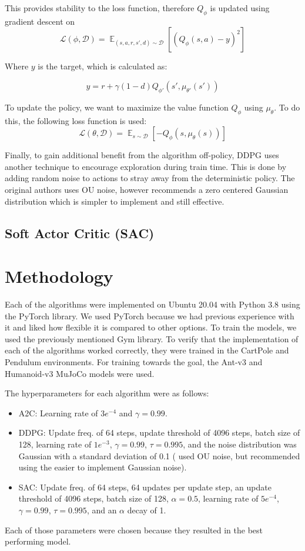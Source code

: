 \documentclass[conference]{IEEEtran}
\begin{document}
This provides stability to the loss function, therefore $Q_\phi$ is updated using gradient descent on
$$
    \mathcal{L}(\phi, \mathcal{D}) = \mathop{\mathbb{E}}_{(s,a,r,s',d) \sim \mathcal{D}}\left[\left(Q_\phi(s,a) - y\right)^2\right]
$$
\begin{flushleft}
    Where $y$ is the target, which is calculated as:
\end{flushleft}
$$
    y = r + \gamma(1-d)Q_{\phi'}(s', \mu_{\theta'}(s'))
$$

To update the policy, we want to maximize the value function $Q_\phi$ using $\mu_\theta$. To do this, the following loss function is used:
$$
    \mathcal{L}(\theta, \mathcal{D}) = \mathop{\mathbb{E}}_{s \sim \mathcal{D}}\left[-Q_\phi(s, \mu_\theta(s))\right]
$$

Finally, to gain additional benefit from the algorithm off-policy, DDPG uses another technique to encourage exploration during train time. This is done by adding random noise to actions to stray away from the deterministic policy. The original authors uses OU noise, however \cite{spinning_up_ddpg} recommends a zero centered Gaussian distribution which is simpler to implement and still effective.

\subsection{Soft Actor Critic (SAC)}

\blindtext

\section{Methodology}

Each of the algorithms were implemented on Ubuntu 20.04 with Python 3.8 using the PyTorch library. We used PyTorch because we had previous experience with it and liked how flexible it is compared to other options. To train the models, we used the previously mentioned Gym library. To verify that the implementation of each of the algorithms worked correctly, they were trained in the CartPole and Pendulum environments. For training towards the goal, the Ant-v3 and Humanoid-v3 MuJoCo models were used.

The hyperparameters for each algorithm were as follows:
\begin{itemize}
    \item A2C: Learning rate of $3e^{-4}$ and $\gamma = 0.99$.
    \item DDPG: Update freq. of 64 steps, update threshold of 4096 steps, batch size of 128, learning rate of $1e^{-3}$, $\gamma = 0.99$, $\tau = 0.995$, and the noise distribution was Gaussian with a standard deviation of 0.1 (\cite{DDPG} used OU noise, but \cite{spinning_up_ddpg} recommended using the easier to implement Gaussian noise).
    \item SAC: Update freq. of 64 steps, 64 updates per update step, an update threshold of 4096 steps, batch size of 128, $\alpha = 0.5$, learning rate of $5e^{-4}$, $\gamma = 0.99$, $\tau = 0.995$, and an $\alpha$ decay of 1.
\end{itemize}
Each of those parameters were chosen because they resulted in the best performing model.
\end{document}
